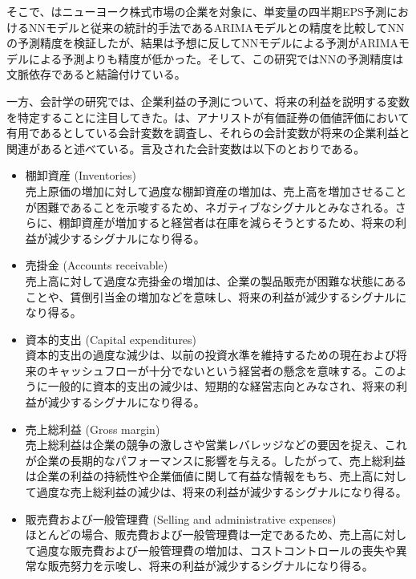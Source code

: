 \documentclass[a4paper, 12pt]{jsarticle}
\begin{document}
そこで、\cite{callen1996neural}はニューヨーク株式市場の企業を対象に、単変量の四半期EPS予測におけるNNモデルと従来の統計的手法であるARIMAモデルとの精度を比較してNNの予測精度を検証したが、結果は予想に反してNNモデルによる予測がARIMAモデルによる予測よりも精度が低かった。そして、この研究ではNNの予測精度は文脈依存であると結論付けている。

一方、会計学の研究では、企業利益の予測について、将来の利益を説明する変数を特定することに注目してきた。\cite*{lev1993fundamental}は、アナリストが有価証券の価値評価において有用であるとしている会計変数を調査し、それらの会計変数が将来の企業利益と関連があると述べている。言及された会計変数は以下のとおりである。

\begin{itemize}
\item 棚卸資産 (Inventories) \\
    売上原価の増加に対して過度な棚卸資産の増加は、売上高を増加させることが困難であることを示唆するため、ネガティブなシグナルとみなされる。さらに、棚卸資産が増加すると経営者は在庫を減らそうとするため、将来の利益が減少するシグナルになり得る。

\item 売掛金 (Accounts receivable) \\
    売上高に対して過度な売掛金の増加は、企業の製品販売が困難な状態にあることや、賃倒引当金の増加などを意味し、将来の利益が減少するシグナルになり得る。

\item 資本的支出 (Capital expenditures) \\
    資本的支出の過度な減少は、以前の投資水準を維持するための現在および将来のキャッシュフローが十分でないという経営者の懸念を意味する。このように一般的に資本的支出の減少は、短期的な経営志向とみなされ、将来の利益が減少するシグナルになり得る。

\item 売上総利益 (Gross margin) \\
    売上総利益は企業の競争の激しさや営業レバレッジなどの要因を捉え、これが企業の長期的なパフォーマンスに影響を与える。したがって、売上総利益は企業の利益の持続性や企業価値に関して有益な情報をもち、売上高に対して過度な売上総利益の減少は、将来の利益が減少するシグナルになり得る。

\item 販売費および一般管理費 (Selling and administrative expenses) \\
    ほとんどの場合、販売費および一般管理費は一定であるため、売上高に対して過度な販売費および一般管理費の増加は、コストコントロールの喪失や異常な販売努力を示唆し、将来の利益が減少するシグナルになり得る。


\end{itemize}
\end{document}

